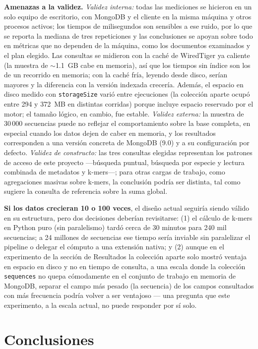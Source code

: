 \documentclass[pdflatex,sn-vancouver-num,lineno,referee]{sn-jnl}
\begin{document}
\textbf{Amenazas a la validez.} \emph{Validez interna:} todas las mediciones
se hicieron en un solo equipo de escritorio, con MongoDB y el cliente en la
misma máquina y otros procesos activos; los tiempos de milisegundos son
sensibles a ese ruido, por lo que se reporta la mediana de tres repeticiones
y las conclusiones se apoyan sobre todo en métricas que no dependen de la
máquina, como los documentos examinados y el plan elegido. Las consultas se
midieron con la caché de WiredTiger ya caliente (la muestra de $\sim$1.1~GB
cabe en memoria), así que los tiempos sin índice son los de un recorrido en
memoria; con la caché fría, leyendo desde disco, serían mayores y la
diferencia con la versión indexada crecería. Además, el espacio en disco
medido con \texttt{storageSize} varió entre ejecuciones (la colección aparte
ocupó entre 294 y 372~MB en distintas corridas) porque incluye espacio
reservado por el motor; el tamaño lógico, en cambio, fue estable.
\emph{Validez externa:} la muestra de 30\,000 secuencias puede no reflejar
el comportamiento sobre la base completa, en especial cuando los datos dejen
de caber en memoria, y los resultados corresponden a una versión concreta de
MongoDB (9.0) y a su configuración por defecto. \emph{Validez de
constructo:} las tres consultas elegidas representan los patrones de acceso
de este proyecto ---búsqueda puntual, búsqueda por especie y lectura combinada
de metadatos y k-mers---; para otras cargas de trabajo, como agregaciones
masivas sobre k-mers, la conclusión podría ser distinta, tal como sugiere la
consulta de referencia sobre la suma global.

\textbf{Si los datos crecieran 10 o 100 veces}, el diseño actual seguiría
siendo válido en su estructura, pero dos decisiones deberían revisitarse: (1)
el cálculo de k-mers en Python puro (sin paralelismo) tardó cerca de 30
minutos para 240 mil secuencias; a 24 millones de secuencias ese tiempo sería
inviable sin paralelizar el pipeline o delegar el cómputo a una extensión
nativa; y (2) aunque en el experimento de la sección de Resultados la colección
aparte solo mostró ventaja en espacio en disco y no en tiempo de consulta, a una escala donde la colección
\texttt{sequences} no quepa cómodamente en el conjunto de trabajo en memoria
de MongoDB, separar el campo más pesado (la secuencia) de los campos
consultados con más frecuencia podría volver a ser ventajoso --- una pregunta
que este experimento, a la escala actual, no puede responder por sí solo.

\section{Conclusiones}\label{sec:conclusiones}
\end{document}
